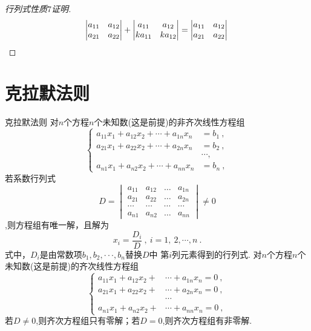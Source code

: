 \documentclass[8pt a4paper, oneside, UTF8]{ctexbook}
\begin{document}
\begin{sloppypar}
\begin{enumerate}
\begin{proof}[行列式性质$7$证明]
$$\begin{vmatrix}
                a_{11} & a_{12}\\
                a_{21} & a_{22}
            \end{vmatrix}+\begin{vmatrix}
                a_{11} & a_{12}\\
                ka_{11} & ka_{12} 
            \end{vmatrix}=\begin{vmatrix}
                a_{11} & a_{12}\\
                a_{21} & a_{22}
            \end{vmatrix}\\
            $$
        \end{proof}
    \end{enumerate}
    \section{克拉默法则}
    \begin{defn}{克拉默法则}{}
        对$n$个方程$n$个未知数(这是前提)的非齐次线性方程组
        $$
            \begin{cases}
                a_{11}x_1+a_{12}x_2+\cdots+a_{1n}x_n&=b_1\:,\\
                a_{21}x_1+a_{22}x_2+\cdots+a_{2n}x_n&=b_2\:,\\ 
                &\cdots ,\\
                a_{n1}x_1+a_{n2}x_2+\cdots+a_{nn}x_n&=b_n\:,
            \end{cases}
        $$
        若系数行列式
        $$
        D=\begin{vmatrix}
            a_{11}&a_{12}&\ldots&a_{1n}\\
            a_{21}&a_{22}&\ldots&a_{2n}\\
            \cdots & \cdots & \cdots & \cdots\\
            a_{n1}&a_{n2}&\ldots&a_{nn}
        \end{vmatrix} \neq 0
        $$
        ,则方程组有唯一解，且解为
        $$
            x_i=\frac{D_i}{D}\:,\:i=1,\:2,\cdots,n\:.
        $$
        式中，$D_i$是由常数项$b_1, b_2, \cdotp \cdotp \cdotp , b_n$替换$D$中 第$i$列元素得到的行列式.
        对$n$个方程$n$个未知数(这是前提)的齐次线性方程组
        $$
            \begin{cases}
                a_{11}x_1+a_{12}x_2+&\cdots+a_{1n}x_n=0\:,\\
                a_{21}x_1+a_{22}x_2+&\cdots+a_{2n}x_n=0\:,\\
                &\cdots
                \\a_{n1}x_1+a_{n2}x_2+&\cdots+a_{nn}x_n=0\:,
            \end{cases}
        $$
        若$D\neq0$,则齐次方程组只有零解；若$D=0$,则齐次方程组有非零解.
    \end{defn}

\end{sloppypar}
\end{document}
